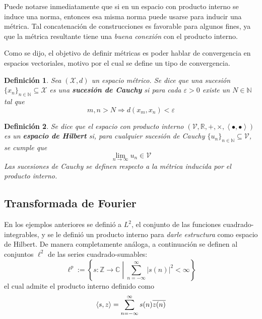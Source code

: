 \documentclass[12pt,letterpaper,draft]{book}
\newtheorem{definicion}{Definición}[chapter]
\newcommand{\R}{\mathbb{R}}
\newcommand{\C}{\mathbb{C}}
\newcommand{\N}{\mathbb{N}}
\newcommand{\Z}{\mathbb{Z}}
\newcommand{\abso}[1]{\left| #1 \right|}
\newcommand{\producto}[1]{\left\langle #1 \right\rangle}
\newcommand{\talque}{\mathrel{}\middle|\mathrel{}}
\begin{document}
Puede notarse inmediatamente que si en un espacio con producto interno se induce una norma, entonces esa misma norma puede usarse para inducir una métrica.
%
Tal concatenación de construcciones es favorable para algunos fines, ya que la métrica resultante tiene una \textit{buena conexión} con el producto interno.

Como se dijo, el objetivo de definir métricas es poder hablar de convergencia en espacios vectoriales, motivo por el cual se define un tipo de convergencia.

\begin{definicion}
Sea $(\mathcal{X},d)$ un espacio métrico. Se dice que una sucesión $\{x_n\}_{n\in \N} \subseteq \mathcal{X}$ es una \textbf{sucesión de Cauchy} si para cada $\varepsilon > 0$ existe un $N \in \N$ tal que
\begin{equation}
m, n > N \Rightarrow d(x_m, x_n) < \varepsilon
\end{equation}
\end{definicion}

\begin{definicion}
Se dice que el espacio con producto interno $(\mathcal{V},\R,+,\times, \producto{\bullet,\bullet})$ es un \textbf{espacio de Hilbert} si, para cualquier sucesión de Cauchy $\{u_n\}_{n\in \N} \subseteq \mathcal{V}$, se cumple que
\begin{equation}
\lim_{n\rightarrow\infty} u_n \in \mathcal{V}
\end{equation}
Las sucesiones de Cauchy se definen respecto a la métrica inducida por el producto interno.
\end{definicion}


\subsection{Transformada de Fourier}
\label{sec:fourier1}

En los ejemplos anteriores se definió a $L^{2}$, el conjunto de las funciones cuadrado-integrables, y se le definió un producto interno para \textit{darle estructura} como espacio de Hilbert.
%
De manera completamente análoga, a continuación se definen al conjuntos $\ell^{2}$ de las series cuadrado-sumables:
\begin{equation}
\ell^{p} := \left\{ s: \Z\rightarrow\C \talque \sum_{n=-\infty}^{\infty} \abso{s(n)}^{2} < \infty \right\}
\end{equation}
el cual admite el producto interno definido como
\begin{equation}
\left\langle s,z \right\rangle = \sum_{n=-\infty}^{\infty} s(n) \overline{z(n)}\\
\end{equation}
\end{document}
